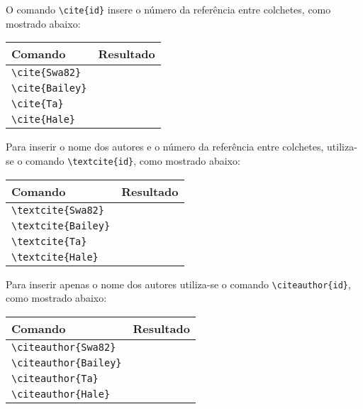O comando \lstinline+\cite{id}+ insere o número da referência entre colchetes,
como mostrado abaixo:
\begin{table}[!h]
  \centering
  \begin{tabular}{lc}
    \toprule
    Comando & Resultado \\ \midrule
    \lstinline+\cite{Swa82}+ & \cite{Swa82} \\
    \lstinline+\cite{Bailey}+ & \cite{Bailey} \\
    \lstinline+\cite{Ta}+ & \cite{Ta} \\
    \lstinline+\cite{Hale}+ & \cite{Hale} \\ \bottomrule
  \end{tabular}
\end{table}

Para inserir o nome dos autores e o número da referência entre colchetes,
utiliza-se o comando \lstinline+\textcite{id}+, como mostrado abaixo:
\begin{table}[!h]
  \centering
  \begin{tabular}{ll}
    \toprule
    Comando & Resultado \\ \midrule
    \lstinline+\textcite{Swa82}+ & \textcite{Swa82} \\
    \lstinline+\textcite{Bailey}+ & \textcite{Bailey} \\
    \lstinline+\textcite{Ta}+ & \textcite{Ta} \\
    \lstinline+\textcite{Hale}+ & \textcite{Hale} \\ \bottomrule
  \end{tabular}
\end{table}

Para inserir apenas o nome dos autores utiliza-se o comando
\lstinline+\citeauthor{id}+, como mostrado abaixo:
\begin{table}[!h]
  \centering
  \begin{tabular}{ll}
    \toprule
    Comando & Resultado \\ \midrule
    \lstinline+\citeauthor{Swa82}+ & \citeauthor{Swa82} \\
    \lstinline+\citeauthor{Bailey}+ & \citeauthor{Bailey} \\
    \lstinline+\citeauthor{Ta}+ & \citeauthor{Ta} \\
    \lstinline+\citeauthor{Hale}+ & \citeauthor{Hale} \\ \bottomrule
  \end{tabular}
\end{table}

